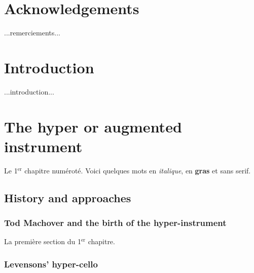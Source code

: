 \documentclass[12pt,twoside,maitrise]{dms}
\theoremstyle{definition}
\begin{document}

\chapter*{Acknowledgements}

...remerciements...


\NoChapterPageNumber
\cleardoublepage


\chapter*{Introduction}

...introduction...


\chapter{The hyper or augmented instrument}

Le 1$^{\text{er}}$ chapitre numéroté. Voici quelques mots en \emph{italique}, en \textbf{gras} et \textsf{sans serif}.

\section{History and approaches}

\subsection{Tod Machover and the birth of the hyper-instrument}

La premi\`ere section du 1$^{\text{er}}$ chapitre.

\subsection{Levensons' hyper-cello}
\end{document}

